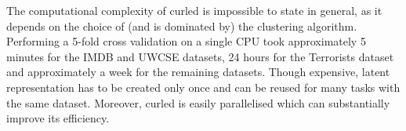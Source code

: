 The computational complexity of \gls{curled} is impossible to state in general, as it depends on the choice of (and is dominated by) the clustering algorithm.
Performing a 5-fold cross validation on a single CPU took approximately 5 minutes for the IMDB and UWCSE datasets, 24 hours for the Terrorists dataset and approximately a week for the remaining datasets.
Though expensive, latent representation has to be created only once and can be reused for many tasks with the same dataset.
Moreover, \gls{curled} is easily parallelised which can substantially improve its efficiency.


\begin{table}[t]
\captionsetup{justification=centerlast}
\centering
\footnotesize
\caption[Vocabulary sizes of various latent representations create by \gls{curled}]{Vocabulary sizes. M indicates MRC, while S and H indicate \gls{curled} representations with spectral and hierarchical clustering, respectively. Vocabulary sizes obtained with \textit{merging} and \textit{combination} similarities were similar, so only the one for merging is reported. }
\end{table}
